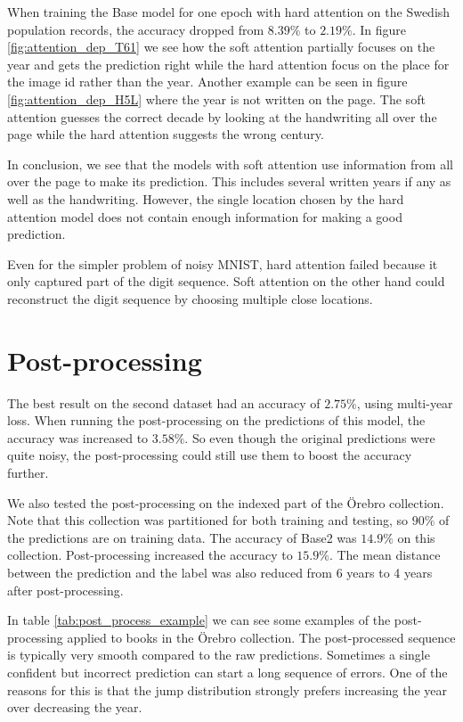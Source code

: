 


When training the Base model for one epoch with hard attention on the Swedish population records, the accuracy dropped from $8.39\%$ to $2.19\%$.
In figure \ref{fig:attention_dep_T61} we see how the soft attention partially focuses on the year and gets the prediction right while the hard attention focus on the place for the image id rather than the year.
Another example can be seen in figure \ref{fig:attention_dep_H5L} where the year is not written on the page. The soft attention guesses the correct decade by looking at the handwriting all over the page while the hard attention suggests the wrong century.

In conclusion, we see that the models with soft attention use information from all over the page to make its prediction. This includes several written years if any as well as the handwriting.
However, the single location chosen by the hard attention model does not contain enough information for making a good prediction.

Even for the simpler problem of noisy MNIST, hard attention failed because it only captured part of the digit sequence. Soft attention on the other hand could reconstruct the digit sequence by choosing multiple close locations.


\section{Post-processing} \label{sec:result_post_process}

The best result on the second dataset had an accuracy of $2.75\%$, using multi-year loss. When running the post-processing on the predictions of this model, the accuracy was increased to $3.58\%$. So even though the original predictions were quite noisy, the post-processing could still use them to boost the accuracy further.

We also tested the post-processing on the indexed part of the Örebro collection. Note that this collection was partitioned for both training and testing, so $90\%$ of the predictions are on training data. The accuracy of  Base2 was $14.9\%$ on this collection. Post-processing increased the accuracy to $15.9\%$. The mean distance between the prediction and the label was also reduced from 6 years to 4 years after post-processing.



In table \ref{tab:post_process_example} we can see some examples of the post-processing applied to books in the Örebro collection. The post-processed sequence is typically very smooth compared to the raw predictions. Sometimes a single confident but incorrect prediction can start a long sequence of errors. One of the reasons for this is that the jump distribution strongly prefers increasing the year over decreasing the year.

